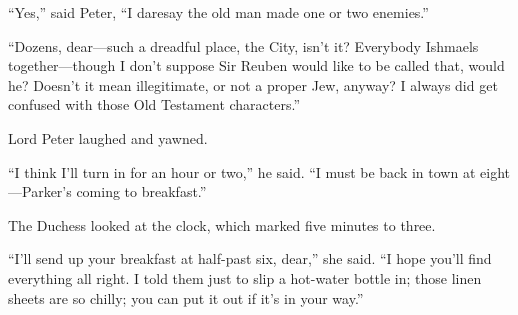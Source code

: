 \enquote{Yes,} said Peter, \enquote{I daresay the old man made one or two enemies.}

\enquote{Dozens, dear\allowbreak---\allowbreak such a dreadful place, the City, isn’t it? Everybody Ishmaels together\allowbreak---\allowbreak though I don’t suppose Sir Reuben would like to be called that, would he? Doesn’t it mean illegitimate, or not a proper Jew, anyway? I always did get confused with those Old Testament characters.}

Lord Peter laughed and yawned.

\enquote{I think I’ll turn in for an hour or two,} he said. \enquote{I must be back in town at eight\allowbreak---\allowbreak Parker’s coming to breakfast.}

The Duchess looked at the clock, which marked five minutes to three.

\enquote{I’ll send up your breakfast at half-past six, dear,} she said. \enquote{I hope you’ll find everything all right. I told them just to slip a hot-water bottle in; those linen sheets are so chilly; you can put it out if it’s in your way.}
